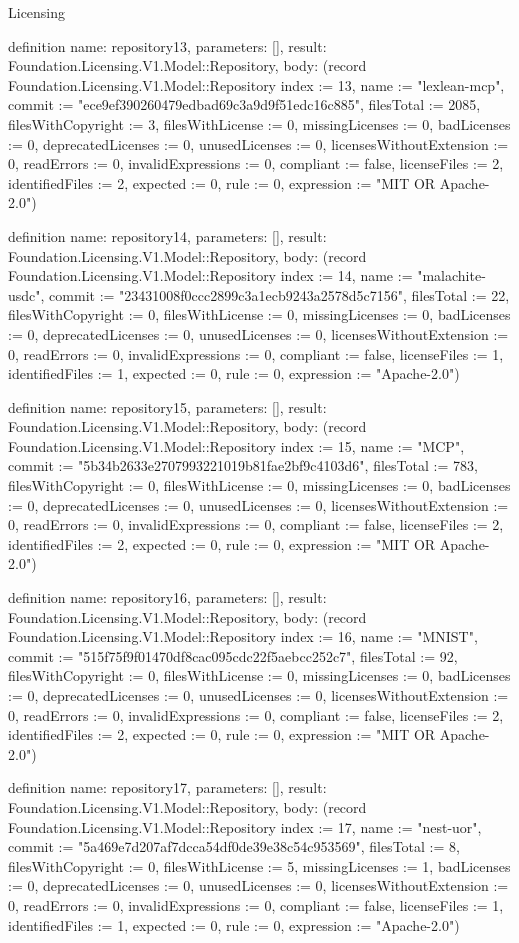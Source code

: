 \begin{lexlean}{Licensing}
\begin{semanticmodule}
definition{
  name: repository13,
  parameters: [],
  result: Foundation.Licensing.V1.Model::Repository,
  body: (record Foundation.Licensing.V1.Model::Repository {index := 13, name := "lexlean-mcp", commit := "ece9ef390260479edbad69c3a9d9f51edc16c885", filesTotal := 2085, filesWithCopyright := 3, filesWithLicense := 0, missingLicenses := 0, badLicenses := 0, deprecatedLicenses := 0, unusedLicenses := 0, licensesWithoutExtension := 0, readErrors := 0, invalidExpressions := 0, compliant := false, licenseFiles := 2, identifiedFiles := 2, expected := 0, rule := 0, expression := "MIT OR Apache-2.0"})
}

definition{
  name: repository14,
  parameters: [],
  result: Foundation.Licensing.V1.Model::Repository,
  body: (record Foundation.Licensing.V1.Model::Repository {index := 14, name := "malachite-usdc", commit := "23431008f0ccc2899c3a1ecb9243a2578d5c7156", filesTotal := 22, filesWithCopyright := 0, filesWithLicense := 0, missingLicenses := 0, badLicenses := 0, deprecatedLicenses := 0, unusedLicenses := 0, licensesWithoutExtension := 0, readErrors := 0, invalidExpressions := 0, compliant := false, licenseFiles := 1, identifiedFiles := 1, expected := 0, rule := 0, expression := "Apache-2.0"})
}

definition{
  name: repository15,
  parameters: [],
  result: Foundation.Licensing.V1.Model::Repository,
  body: (record Foundation.Licensing.V1.Model::Repository {index := 15, name := "MCP", commit := "5b34b2633e2707993221019b81fae2bf9c4103d6", filesTotal := 783, filesWithCopyright := 0, filesWithLicense := 0, missingLicenses := 0, badLicenses := 0, deprecatedLicenses := 0, unusedLicenses := 0, licensesWithoutExtension := 0, readErrors := 0, invalidExpressions := 0, compliant := false, licenseFiles := 2, identifiedFiles := 2, expected := 0, rule := 0, expression := "MIT OR Apache-2.0"})
}

definition{
  name: repository16,
  parameters: [],
  result: Foundation.Licensing.V1.Model::Repository,
  body: (record Foundation.Licensing.V1.Model::Repository {index := 16, name := "MNIST", commit := "515f75f9f01470df8cac095cdc22f5aebcc252c7", filesTotal := 92, filesWithCopyright := 0, filesWithLicense := 0, missingLicenses := 0, badLicenses := 0, deprecatedLicenses := 0, unusedLicenses := 0, licensesWithoutExtension := 0, readErrors := 0, invalidExpressions := 0, compliant := false, licenseFiles := 2, identifiedFiles := 2, expected := 0, rule := 0, expression := "MIT OR Apache-2.0"})
}

definition{
  name: repository17,
  parameters: [],
  result: Foundation.Licensing.V1.Model::Repository,
  body: (record Foundation.Licensing.V1.Model::Repository {index := 17, name := "nest-uor", commit := "5a469e7d207af7dcca54df0de39e38c54c953569", filesTotal := 8, filesWithCopyright := 0, filesWithLicense := 5, missingLicenses := 1, badLicenses := 0, deprecatedLicenses := 0, unusedLicenses := 0, licensesWithoutExtension := 0, readErrors := 0, invalidExpressions := 0, compliant := false, licenseFiles := 1, identifiedFiles := 1, expected := 0, rule := 0, expression := "Apache-2.0"})
}


\end{semanticmodule}
\end{lexlean}
